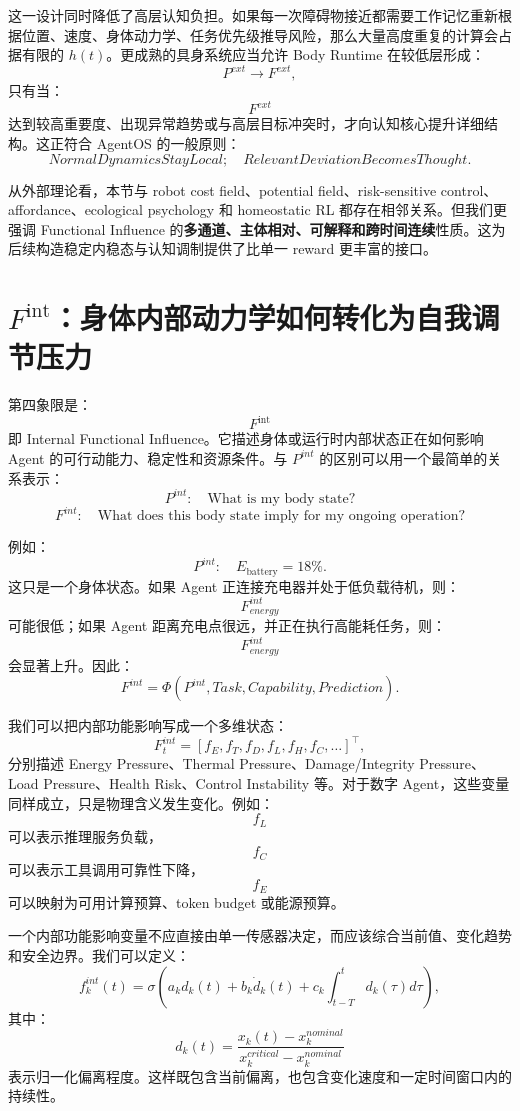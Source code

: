 这一设计同时降低了高层认知负担。如果每一次障碍物接近都需要工作记忆重新根据位置、速度、身体动力学、任务优先级推导风险，那么大量高度重复的计算会占据有限的 $h(t)$。更成熟的具身系统应当允许 Body Runtime 在较低层形成：
\[
P^{ext}
\rightarrow
F^{ext},
\]
只有当：
\[
F^{ext}
\]
达到较高重要度、出现异常趋势或与高层目标冲突时，才向认知核心提升详细结构。这正符合 AgentOS 的一般原则：
\[
\boxed{
NormalDynamicsStayLocal;
\quad
RelevantDeviationBecomesThought.
}
\]

从外部理论看，本节与 robot cost field、potential field、risk-sensitive control、affordance、ecological psychology 和 homeostatic RL 都存在相邻关系。但我们更强调 Functional Influence 的\textbf{多通道、主体相对、可解释和跨时间连续}性质。这为后续构造稳定内稳态与认知调制提供了比单一 reward 更丰富的接口。

\section{$F^{\mathrm{int}}$：身体内部动力学如何转化为自我调节压力}
\label{sec:internal-functional-influence}

第四象限是：
\[
\boxed{
F^{\mathrm{int}}
}
\]
即 Internal Functional Influence。它描述身体或运行时内部状态正在如何影响 Agent 的可行动能力、稳定性和资源条件。与 $P^{int}$ 的区别可以用一个最简单的关系表示：
\[
P^{int}
:
\quad
\text{What is my body state?}
\]
\[
F^{int}
:
\quad
\text{What does this body state imply for my ongoing operation?}
\]

例如：
\[
P^{int}
:
\quad
E_{\mathrm{battery}}=18\%.
\]
这只是一个身体状态。如果 Agent 正连接充电器并处于低负载待机，则：
\[
F^{int}_{energy}
\]
可能很低；如果 Agent 距离充电点很远，并正在执行高能耗任务，则：
\[
F^{int}_{energy}
\]
会显著上升。因此：
\[
F^{int}
=
\Phi(
P^{int},
Task,
Capability,
Prediction
).
\]

我们可以把内部功能影响写成一个多维状态：
\[
F_t^{int}
=
[
f_E,
f_T,
f_D,
f_L,
f_H,
f_C,\ldots
]^\top,
\]
分别描述 Energy Pressure、Thermal Pressure、Damage/Integrity Pressure、Load Pressure、Health Risk、Control Instability 等。对于数字 Agent，这些变量同样成立，只是物理含义发生变化。例如：
\[
f_L
\]
可以表示推理服务负载，
\[
f_C
\]
可以表示工具调用可靠性下降，
\[
f_E
\]
可以映射为可用计算预算、token budget 或能源预算。

一个内部功能影响变量不应直接由单一传感器决定，而应该综合当前值、变化趋势和安全边界。我们可以定义：
\[
f_k^{int}(t)
=
\sigma
\left(
a_k d_k(t)
+
b_k \dot d_k(t)
+
c_k \int_{t-T}^{t} d_k(\tau)d\tau
\right),
\]
其中：
\[
d_k(t)
=
\frac{x_k(t)-x_k^{nominal}}
{x_k^{critical}-x_k^{nominal}}
\]
表示归一化偏离程度。这样既包含当前偏离，也包含变化速度和一定时间窗口内的持续性。

